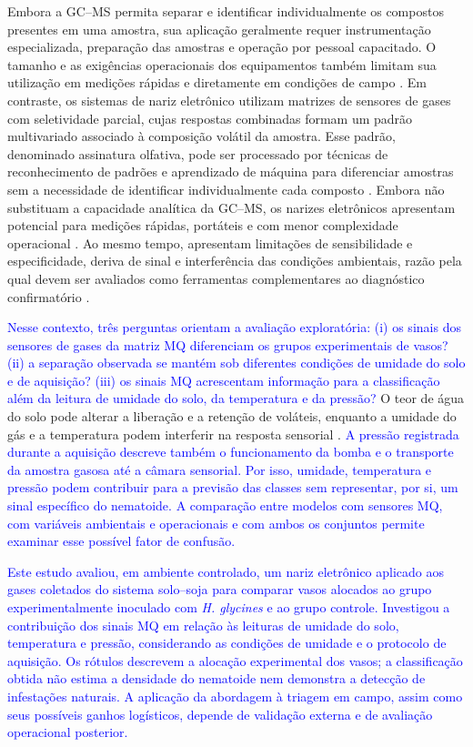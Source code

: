 Embora a GC--MS permita separar e identificar individualmente os compostos presentes em uma amostra, sua aplicação geralmente requer instrumentação especializada, preparação das amostras e operação por pessoal capacitado. O tamanho e as exigências operacionais dos equipamentos também limitam sua utilização em medições rápidas e diretamente em condições de campo \cite{banerji2024}. Em contraste, os sistemas de nariz eletrônico utilizam matrizes de sensores de gases com seletividade parcial, cujas respostas combinadas formam um padrão multivariado associado à composição volátil da amostra. Esse padrão, denominado assinatura olfativa, pode ser processado por técnicas de reconhecimento de padrões e aprendizado de máquina para diferenciar amostras sem a necessidade de identificar individualmente cada composto \cite{berna2010,li2024enose}. Embora não substituam a capacidade analítica da GC--MS, os narizes eletrônicos apresentam potencial para medições rápidas, portáteis e com menor complexidade operacional \cite{li2024enose}. Ao mesmo tempo, apresentam limitações de sensibilidade e especificidade, deriva de sinal e interferência das condições ambientais, razão pela qual devem ser avaliados como ferramentas complementares ao diagnóstico confirmatório \cite{cellini2017}.

\textcolor{blue}{Nesse contexto, três perguntas orientam a avaliação exploratória: (i) os sinais dos sensores de gases da matriz MQ diferenciam os grupos experimentais de vasos? (ii) a separação observada se mantém sob diferentes condições de umidade do solo e de aquisição? (iii) os sinais MQ acrescentam informação para a classificação além da leitura de umidade do solo, da temperatura e da pressão?} O teor de água do solo pode alterar a liberação e a retenção de voláteis, enquanto a umidade do gás e a temperatura podem interferir na resposta sensorial \cite{cellini2017}. \textcolor{blue}{A pressão registrada durante a aquisição descreve também o funcionamento da bomba e o transporte da amostra gasosa até a câmara sensorial. Por isso, umidade, temperatura e pressão podem contribuir para a previsão das classes sem representar, por si, um sinal específico do nematoide. A comparação entre modelos com sensores MQ, com variáveis ambientais e operacionais e com ambos os conjuntos permite examinar esse possível fator de confusão.}

\textcolor{blue}{Este estudo avaliou, em ambiente controlado, um nariz eletrônico aplicado aos gases coletados do sistema solo--soja para comparar vasos alocados ao grupo experimentalmente inoculado com \textit{H. glycines} e ao grupo controle. Investigou a contribuição dos sinais MQ em relação às leituras de umidade do solo, temperatura e pressão, considerando as condições de umidade e o protocolo de aquisição. Os rótulos descrevem a alocação experimental dos vasos; a classificação obtida não estima a densidade do nematoide nem demonstra a detecção de infestações naturais. A aplicação da abordagem à triagem em campo, assim como seus possíveis ganhos logísticos, depende de validação externa e de avaliação operacional posterior.}
